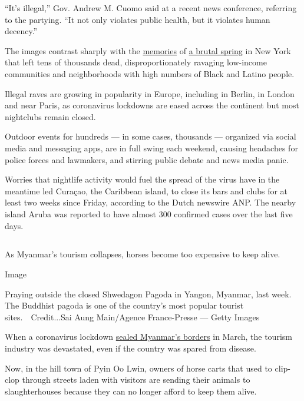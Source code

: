 ``It's illegal,'' Gov. Andrew M. Cuomo said at a recent news conference,
referring to the partying. ``It not only violates public health, but it
violates human decency.''

The images contrast sharply with the
\href{https://www.nytimes.com/2020/08/07/style/coronavirus-nyc-historic-season.html}{memories}
of
\href{https://www.nytimes.com/2020/04/04/nyregion/coronavirus-hospital-brooklyn.html}{a
brutal spring} in New York that left tens of thousands dead,
disproportionately ravaging low-income communities and neighborhoods
with high numbers of Black and Latino people.

Illegal raves are growing in popularity in Europe, including in Berlin,
in London and near Paris, as coronavirus lockdowns are eased across the
continent but most nightclubs remain closed.

Outdoor events for hundreds --- in some cases, thousands --- organized
via social media and messaging apps, are in full swing each weekend,
causing headaches for police forces and lawmakers, and stirring public
debate and news media panic.

Worries that nightlife activity would fuel the spread of the virus have
in the meantime led Curaçao, the Caribbean island, to close its bars and
clubs for at least two weeks since Friday, according to the Dutch
newswire ANP. The nearby island Aruba was reported to have almost 300
confirmed cases over the last five days.

\hypertarget{section-10}{%
\subsection{}\label{section-10}}

As Myanmar's tourism collapses, horses become too expensive to keep
alive.

Image

Praying outside the closed Shwedagon Pagoda in Yangon, Myanmar, last
week. The Buddhist pagoda is one of the country's most popular tourist
sites.~~Credit...Sai Aung Main/Agence France-Presse --- Getty Images

When a coronavirus lockdown
\href{https://www.nytimes.com/2020/03/27/world/asia/coronavirus-myanmar-jobs-china.html?searchResultPosition=7}{sealed
Myanmar's borders} in March, the tourism industry was devastated, even
if the country was spared from disease.

Now, in the hill town of Pyin Oo Lwin, owners of horse carts that used
to clip-clop through streets laden with visitors are sending their
animals to slaughterhouses because they can no longer afford to keep
them alive.

